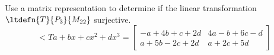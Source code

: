 Use a matrix representation to determine if the linear transformation $\ltdefn{T}{P_3}{M_{22}}$ surjective.
\begin{equation*}
\lt{T}{a+bx+cx^2+dx^3}=
\begin{bmatrix}
-a+4b+c+2d & 4a-b+6c-d\\
a+5b-2c+2d & a+2c+5d
\end{bmatrix}
\end{equation*}